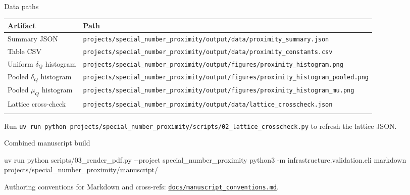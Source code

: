 \documentclass[
  ignorenonframetext,
]{beamer}
\newenvironment{Shaded}{}{}
\newcommand{\AttributeTok}[1]{\textcolor[rgb]{0.49,0.56,0.16}{#1}}
\newcommand{\ExtensionTok}[1]{#1}
\newcommand{\NormalTok}[1]{#1}
\newcounter{none} %
\begin{document}
\begin{frame}[fragile]{Data paths}
\protect{}\label{data-paths}
{\def\LTcaptype{none} %
\begin{longtable}[]{@{}
  >{\raggedright\arraybackslash}p{}
  >{\raggedright\arraybackslash}p{}@{}}
\toprule\noalign{}
\begin{minipage}[b]{\linewidth}\raggedright
Artifact
\end{minipage} & \begin{minipage}[b]{\linewidth}\raggedright
Path
\end{minipage} \\
\midrule\noalign{}
\endhead
Summary JSON &
\texttt{projects/special\_number\_proximity/output/data/proximity\_summary.json} \\
Table CSV &
\texttt{projects/special\_number\_proximity/output/data/proximity\_constants.csv} \\
Uniform \(\delta_Q\) histogram &
\texttt{projects/special\_number\_proximity/output/figures/proximity\_histogram.png} \\
Pooled \(\delta_Q\) histogram &
\texttt{projects/special\_number\_proximity/output/figures/proximity\_histogram\_pooled.png} \\
Pooled \(\mu_Q\) histogram &
\texttt{projects/special\_number\_proximity/output/figures/proximity\_histogram\_mu.png} \\
Lattice cross-check &
\texttt{projects/special\_number\_proximity/output/data/lattice\_crosscheck.json} \\
\bottomrule\noalign{}
\end{longtable}
}

Run
\texttt{uv\ run\ python\ projects/special\_number\_proximity/scripts/02\_lattice\_crosscheck.py}
to refresh the lattice JSON.
\end{frame}

\begin{frame}[fragile]{Combined manuscript build}
\protect{}\label{combined-manuscript-build}
\begin{Shaded}
\begin{Highlighting}[]
\ExtensionTok{uv}\NormalTok{ run python scripts/03\_render\_pdf.py }\AttributeTok{{-}{-}project}\NormalTok{ special\_number\_proximity}
\ExtensionTok{python3} \AttributeTok{{-}m}\NormalTok{ infrastructure.validation.cli markdown projects/special\_number\_proximity/manuscript/}
\end{Highlighting}
\end{Shaded}

Authoring conventions for Markdown and cross-refs:
\href{../docs/manuscript_conventions.md}{\texttt{docs/manuscript\_conventions.md}}.
\end{frame}
\end{document}
